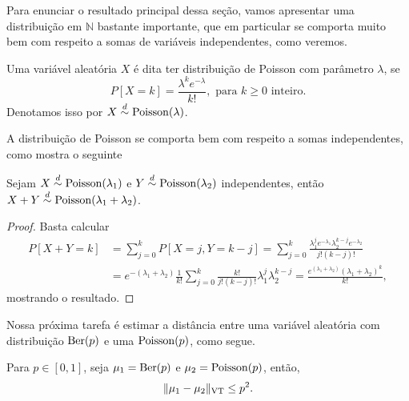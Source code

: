 \begin{topics}
Para enunciar o resultado principal dessa seção, vamos apresentar uma distribuição em $\mathbb{N}$ bastante importante, que em particular se comporta muito bem com respeito a somas de variáveis independentes, como veremos.

\begin{definition}
  Uma variável aleatória $X$ é dita ter distribuição de Poisson  com parâmetro $\lambda$, se
  \begin{equation}
    P[X = k] = \frac{\lambda^k e^{-\lambda}}{k!}, \text{ para $k \geq 0$ inteiro.}
  \end{equation}
  Denotamos isso por $X \overset{d}\sim \operatorname{Poisson}(\lambda)$.
\end{definition}

A distribuição de Poisson se comporta bem com respeito a somas independentes, como mostra o seguinte
\begin{lemma}
\label{l:soma_poisson}
Sejam $X \overset{d}\sim \operatorname{Poisson}(\lambda_1)$ e $Y \overset{d}\sim \operatorname{Poisson}(\lambda_2)$ independentes, então $X+Y \overset{d}\sim \operatorname{Poisson}(\lambda_1 + \lambda_2)$.
\end{lemma}

\begin{proof}
Basta calcular
\begin{equation}
  \begin{split}
    P[X+Y = k] & = \sum_{j = 0}^k P[X = j, Y = k-j] = \sum_{j = 0}^k \frac{\lambda_1^j e^{-\lambda_1} \lambda_2^{k-j} e^{-\lambda_2}}{j! (k-j)!}\\
    & = e^{-(\lambda_1 + \lambda_2)} \frac{1}{k!} \sum_{j = 0}^k \frac{k!}{j! (k-j)!} \lambda_1^j \lambda_2^{k-j} = \frac{e^{(\lambda_1 + \lambda_2)} (\lambda_1 + \lambda_2)^k}{k!},
  \end{split}
\end{equation}
mostrando o resultado.
\end{proof}

Nossa próxima tarefa é estimar a distância entre uma variável aleatória com distribuição $\operatorname{Ber}(p)$ e uma $\operatorname{Poisson}(p)$, como segue.

\begin{lemma}
\label{l:vt_ber_poiss}
Para $p \in [0,1]$, seja $\mu_1 = \operatorname{Ber}(p)$ e $\mu_2 = \operatorname{Poisson}(p)$, então,
\begin{equation}
  \lVert \mu_1 - \mu_2 \rVert_{\operatorname{VT}} \leq p^2.
\end{equation}
\end{lemma}


\end{topics}
